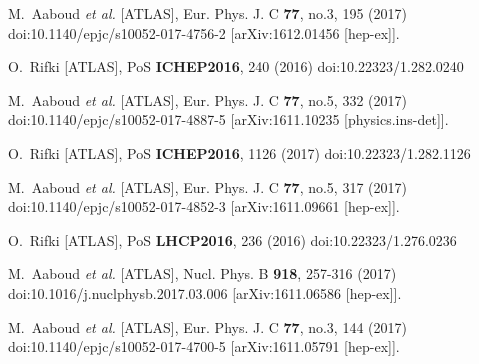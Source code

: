 \begin{thebibliography}{9}
M.~Aaboud \textit{et al.} [ATLAS],
Eur. Phys. J. C \textbf{77}, no.3, 195 (2017)
doi:10.1140/epjc/s10052-017-4756-2
[arXiv:1612.01456 [hep-ex]].

O.~Rifki [ATLAS],
PoS \textbf{ICHEP2016}, 240 (2016)
doi:10.22323/1.282.0240

M.~Aaboud \textit{et al.} [ATLAS],
Eur. Phys. J. C \textbf{77}, no.5, 332 (2017)
doi:10.1140/epjc/s10052-017-4887-5
[arXiv:1611.10235 [physics.ins-det]].

O.~Rifki [ATLAS],
PoS \textbf{ICHEP2016}, 1126 (2017)
doi:10.22323/1.282.1126

M.~Aaboud \textit{et al.} [ATLAS],
Eur. Phys. J. C \textbf{77}, no.5, 317 (2017)
doi:10.1140/epjc/s10052-017-4852-3
[arXiv:1611.09661 [hep-ex]].

O.~Rifki [ATLAS],
PoS \textbf{LHCP2016}, 236 (2016)
doi:10.22323/1.276.0236

M.~Aaboud \textit{et al.} [ATLAS],
Nucl. Phys. B \textbf{918}, 257-316 (2017)
doi:10.1016/j.nuclphysb.2017.03.006
[arXiv:1611.06586 [hep-ex]].

M.~Aaboud \textit{et al.} [ATLAS],
Eur. Phys. J. C \textbf{77}, no.3, 144 (2017)
doi:10.1140/epjc/s10052-017-4700-5
[arXiv:1611.05791 [hep-ex]].


\end{thebibliography}
